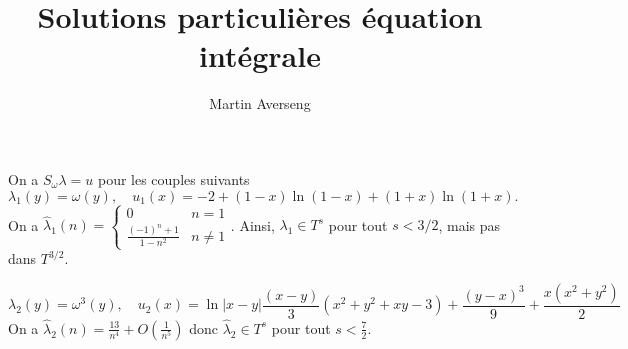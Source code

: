 \documentclass[]{article}
\title{Solutions particulières équation intégrale}
\author{Martin Averseng}
\begin{document}
	\maketitle
	On a $S_\omega \lambda = u$ pour les couples suivants 
	\begin{equation}
		\lambda_1(y) = \omega(y), \quad u_1(x) = -2 + (1-x) \ln(1-x) + (1 + x) \ln(1+x).
	\end{equation}
	On a $\hat{\lambda}_1(n) = \begin{cases}
	0 & n = 1 \\
	\frac{(-1)^n + 1}{1 - n^2} & n \neq 1
	\end{cases}$. Ainsi, $\lambda_1 \in T^s$ pour tout $s < 3/2$, mais pas dans $T^{3/2}$. 
	
	\begin{equation}
		\lambda_2(y) = \omega^3(y), \quad u_2(x) = \ln|x-y|\frac{(x-y)}{3}(x^2 + y^2 + xy - 3) + \frac{(y-x)^3}{9} + \frac{x(x^2 + y^2)}{2}
	\end{equation}
	On a $\hat{\lambda}_2(n) = \frac{13}{n^4} + O\left(\frac{1}{n^5}\right)$ donc $\hat{\lambda}_2 \in T^s$ pour tout $s < \frac{7}{2}$. 
	
\end{document}
